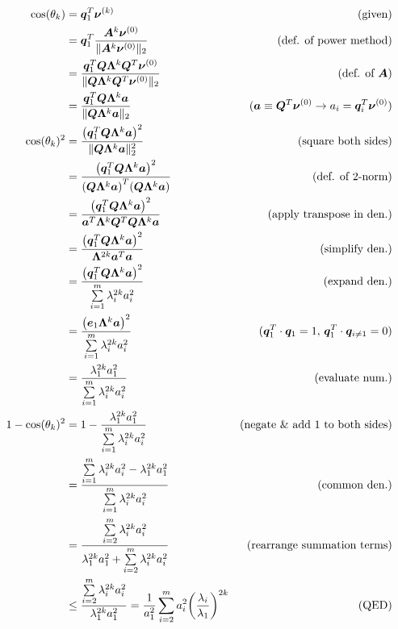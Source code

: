 \documentclass[twoside,10pt]{article}
\begin{document}
\begin{align*}
  \cos(\theta_k) &= \vct{q}_1^{T} \vct{\nu}^{(k)}&\text{(given)}\\
  &= \vct{q}_1^{T} \frac{\mtx{A}^k \vct{\nu}^{(0)}}{\|\mtx{A}^k \vct{\nu}^{(0)}\|_2}&\text{(def. of power method)}\\
  &= \frac{\vct{q}_1^{T} \mtx{Q}\mtx{\Lambda}^k\mtx{Q}^T \vct{\nu}^{(0)}}{\|\mtx{Q}\mtx{\Lambda}^k\mtx{Q}^T \vct{\nu}^{(0)}\|_2}&\text{(def. of $\mtx{A}$)}\\
  &= \frac{\vct{q}_1^{T} \mtx{Q}\mtx{\Lambda}^k\vct{a}}{\|\mtx{Q}\mtx{\Lambda}^k\vct{a}\|_2}&\text{($\vct{a} \equiv \mtx{Q}^T\vct{\nu}^{(0)} \rightarrow a_i = \vct{q}_i^T \vct{\nu}^{(0)}$)}\\
  \cos(\theta_k)^2 &= \frac{\left(\vct{q}_1^{T} \mtx{Q}\mtx{\Lambda}^k\vct{a}\right)^2}{\|\mtx{Q}\mtx{\Lambda}^k\vct{a}\|_2^2}&\text{(square both sides)}\\
  &= \frac{\left(\vct{q}_1^{T} \mtx{Q}\mtx{\Lambda}^k\vct{a}\right)^2}{\left(\mtx{Q}\mtx{\Lambda}^k\vct{a}\right)^T\left(\mtx{Q}\mtx{\Lambda}^k\vct{a}\right)}&\text{(def. of 2-norm)}\\
  &= \frac{\left(\vct{q}_1^{T} \mtx{Q}\mtx{\Lambda}^k\vct{a}\right)^2}{\vct{a}^T\mtx{\Lambda}^k\mtx{Q}^T\mtx{Q}\mtx{\Lambda}^k\vct{a}}&\text{(apply transpose in den.)}\\
  &= \frac{\left(\vct{q}_1^{T} \mtx{Q}\mtx{\Lambda}^k\vct{a}\right)^2}{\mtx{\Lambda}^{2k}\vct{a}^T\vct{a}}&\text{(simplify den.)}\\
  &= \frac{\left(\vct{q}_1^{T} \mtx{Q}\mtx{\Lambda}^k\vct{a}\right)^2}{\sum\limits_{i=1}^m{\lambda_i^{2k} a_i^2}}&\text{(expand den.)}\\
  &= \frac{\left(\vct{e}_1\mtx{\Lambda}^k\vct{a}\right)^2}{\sum\limits_{i=1}^m{\lambda_i^{2k} a_i^2}}&\text{($\vct{q}_1^T\cdot\vct{q}_1 = 1$, $\vct{q}_1^T\cdot\vct{q}_{i \neq 1} = 0$)}\\
  &= \frac{\lambda_1^{2k} a_1^2}{\sum\limits_{i=1}^m{\lambda_i^{2k} a_i^2}}&\text{(evaluate num.)}\\
  1 - \cos(\theta_k)^2 &= 1 - \frac{\lambda_1^{2k} a_1^2}{\sum\limits_{i=1}^m{\lambda_i^{2k} a_i^2}}&\text{(negate \& add 1 to both sides)}\\
  &= \frac{\sum\limits_{i=1}^m{\lambda_i^{2k} a_i^2} - \lambda_1^{2k} a_1^2}{\sum\limits_{i=1}^m{\lambda_i^{2k} a_i^2}}&\text{(common den.)}\\
  &= \frac{\sum\limits_{i=2}^m{\lambda_i^{2k}a_i^2}}{\lambda_1^{2k} a_1^2 + \sum\limits_{i=2}^m \lambda_i^{2k} a_i^2}&\text{(rearrange summation terms)}\\
  &\leq \frac{\sum\limits_{i=2}^m{\lambda_i^{2k}a_i^2}}{\lambda_1^{2k} a_1^2} = \frac{1}{a_1^2} \sum\limits_{i=2}^m a_i^2 \left(\frac{\lambda_i}{\lambda_1}\right)^{2k}&\text{(QED)}\\
\end{align*}
\end{document}
